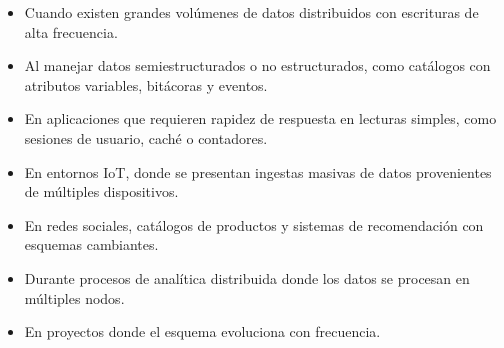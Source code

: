 \begin{itemize}
    \item Cuando existen grandes volúmenes de datos distribuidos con escrituras de alta frecuencia.
    \item Al manejar datos semiestructurados o no estructurados, como catálogos con atributos variables, bitácoras y eventos.
    \item En aplicaciones que requieren rapidez de respuesta en lecturas simples, como sesiones de usuario, caché o contadores.
    \item En entornos IoT, donde se presentan ingestas masivas de datos provenientes de múltiples dispositivos.
    \item En redes sociales, catálogos de productos y sistemas de recomendación con esquemas cambiantes.
    \item Durante procesos de analítica distribuida donde los datos se procesan en múltiples nodos.
    \item En proyectos donde el esquema evoluciona con frecuencia.
\end{itemize}